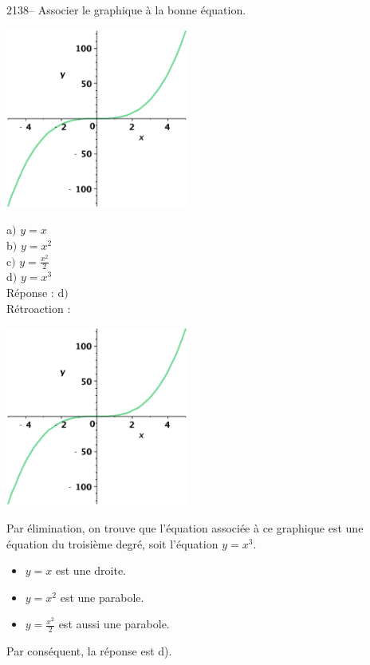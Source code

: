 \documentclass[letterpaper, 12pt]{article}
\begin{document}
2138-- Associer le graphique \`a la bonne \'equation.
\begin{center}
 \includegraphics[width=6cm,bb=20 118 575 673]{Q2138.eps}
\end{center}
a$)$ $y=x$\\[2mm]
b$)$ $y=x^{2}$\\[2mm]
c$)$ $y=\frac{x^{2}}{2}$\\[2mm]
d$)$ $y=x^{3}$\\

R\'eponse : d$)$\\

R\'etroaction :\\
\begin{center}
 \includegraphics[width=6cm,bb=20 118 575 673]{Q2138.eps}
\end{center}
Par \'elimination, on trouve que l'\'equation associ\'ee \`a ce graphique est une \'equation du troisi\`eme degr\'e, soit l'\'equation $y=x^{3}$.\\
\begin{itemize}
 \item $y=x$ est une droite.\\
\item $y=x^{2}$ est une parabole.\\
\item $y=\frac{x^{2}}{2}$ est aussi une parabole.\\
\end{itemize}
Par cons\'equent, la r\'eponse est d).\\
\end{document}
